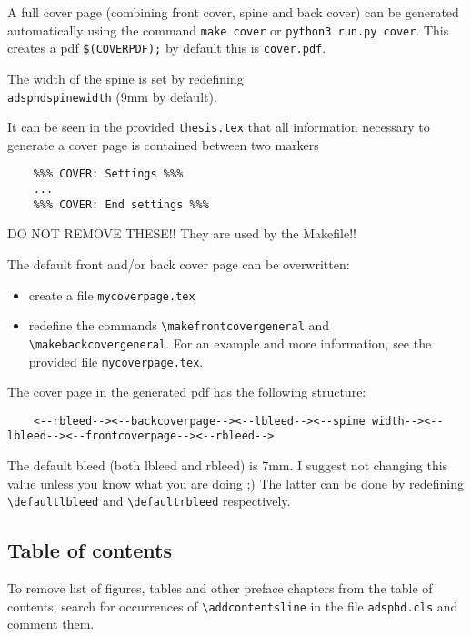 A full cover page (combining front cover, spine and back cover) can be
generated automatically using the command \texttt{make cover} or \texttt{python3 run.py cover}. This creates a pdf
\texttt{\$(COVERPDF);} by default this is \texttt{cover.pdf}.

The width of the spine is set by redefining \texttt{\\adsphdspinewidth} (9mm by default).

It can be seen in the provided \texttt{thesis.tex} that all information necessary to
generate a cover page is contained between two markers

\begin{verbatim}
    %%% COVER: Settings %%%
    ...
    %%% COVER: End settings %%%
\end{verbatim}

DO NOT REMOVE THESE!! They are used by the Makefile!!

The default front and/or back cover page can be overwritten: 

\begin{itemize}
    \item create a file \texttt{mycoverpage.tex}
    \item redefine the commands \texttt{\textbackslash makefrontcovergeneral} and \texttt{\textbackslash makebackcovergeneral}. For
          an example and more information, see the provided file \texttt{mycoverpage.tex}.
\end{itemize}

The cover page in the generated pdf has the following structure:

{\tiny
\begin{verbatim}
    <--rbleed--><--backcoverpage--><--lbleed--><--spine width--><--lbleed--><--frontcoverpage--><--rbleed-->
\end{verbatim}
}

The default bleed (both lbleed and rbleed) is 7mm. I suggest not changing this
value unless you know what you are doing ;) The latter can be done by
redefining \texttt{\textbackslash defaultlbleed} and \texttt{\textbackslash defaultrbleed} respectively.


\subsection{Table of contents}

To remove list of figures, tables and other preface chapters from the table of
contents, search for occurrences of \texttt{\textbackslash addcontentsline} in the file
\texttt{adsphd.cls} and comment them.

